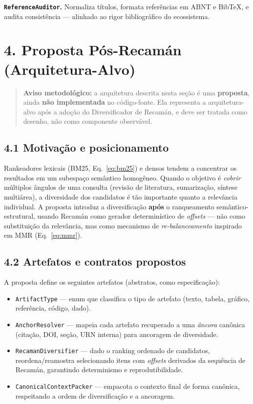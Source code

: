 \documentclass[
	article,
	11pt,
	oneside,
	a4paper,
	english,
	brazil,
	sumario=tradicional
	]{abntex2}
\begin{document}
\noindent\textbf{\texttt{ReferenceAuditor}.} Normaliza títulos, formata referências
em ABNT e BibTeX, e audita consistência — alinhado ao rigor bibliográfico do
ecossistema.

\section*{4. Proposta Pós-Recamán (Arquitetura-Alvo)}

\begin{quote}
\textbf{Aviso metodológico:} a arquitetura descrita nesta seção é uma
\textbf{proposta}, ainda \textbf{não implementada} no código-fonte. Ela representa
a arquitetura-alvo após a adoção do Diversificador de Recamán, e deve ser tratada
como desenho, não como componente observável.
\end{quote}

\subsection*{4.1 Motivação e posicionamento}

Rankeadores lexicais (BM25, Eq.~\ref{eq:bm25}) e densos tendem a concentrar os
resultados em um subespaço semântico homogêneo. Quando o objetivo é \emph{cobrir}
múltiplos ângulos de uma consulta (revisão de literatura, sumarização, síntese
multiárea), a diversidade dos candidatos é tão importante quanto a relevância
individual. A proposta introduz a diversificação \textbf{após} o ranqueamento
semântico-estrutural, usando Recamán como gerador determinístico de
\emph{offsets} — não como substituição da relevância, mas como mecanismo de
\emph{re-balanceamento} inspirado em MMR (Eq.~\ref{eq:mmr}).

\subsection*{4.2 Artefatos e contratos propostos}

A proposta define os seguintes artefatos (abstratos, como especificação):

\begin{itemize}
  \item \texttt{ArtifactType} --- enum que classifica o tipo de artefato
        (texto, tabela, gráfico, referência, código, dado).
  \item \texttt{AnchorResolver} --- mapeia cada artefato recuperado a uma
        \emph{âncora} canônica (citação, DOI, seção, URN interna) para ancoragem
        de diversidade.
  \item \texttt{RecamanDiversifier} --- dado o ranking ordenado de candidatos,
        reordena/reamostra selecionando itens com \emph{offsets} derivados da
        sequência de Recamán, garantindo determinismo e reprodutibilidade.
  \item \texttt{CanonicalContextPacker} --- empacota o contexto final de forma
        canônica, respeitando a ordem de diversificação e a ancoragem.
\end{itemize}
\end{document}
